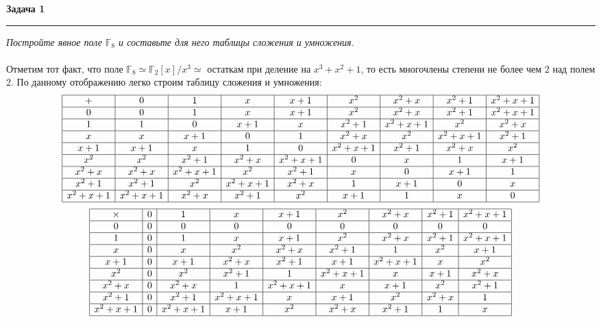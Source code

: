\documentclass[a4paper,11pt]{article}
\newcommand{\F}{\mathbb{F}}
\begin{document}
\textbf{\large Задача 1}
\medskip\hrule\medskip
\textit{Постройте явное поле $ \F_8 $ и составьте для него таблицы сложения и умножения.} \\ \\
Отметим тот факт, что поле $ \F_8 \simeq \F_2[x] / x^3 \simeq $ остаткам при деление на $ x^3 + x^2 + 1 $, то есть многочлены степени не более чем 2 над полем 2. По данному отображению легко строим таблицу сложения и умножения:
\begin{gather*}
	\begin{array}{|c|c|c|c|c|c|c|c|c|}
	\hline
	+			& 0 & 1 & x & x + 1 & x^2 & x^2 + x & x^2 + 1 &  x^2 + x + 1\\
	\hline
	0			& 0 & 1 & x & x + 1 & x^2 & x^2 + x & x^2 + 1 &  x^2 + x + 1\\
	\hline
	1			& 1 & 0 & x + 1 & x & x^2 + 1 & x^2 + x + 1 & x^2 &  x^2 + x\\
	\hline
	x			& x & x + 1 & 0 & 1 & x^2 + x & x^2 & x^2 + x + 1 &  x^2 + 1\\
	\hline
	x + 1		& x + 1 & x & 1 & 0 & x^2 + x + 1 & x^2 + 1 & x^2 + x &  x^2\\
	\hline
	x^2			& x^2 & x^2 + 1 & x^2 + x & x^2 + x + 1 & 0 & x & 1 & x + 1\\
	\hline
	x^2 + x		& x^2 + x & x^2 + x + 1 & x^2 & x^2 + 1 & x & 0 & x + 1 & 1\\
	\hline
	x^2 + 1		& x^2 + 1 & x^2 & x^2 + x + 1 & x^2 + x & 1 & x + 1 & 0 & x\\
	\hline
	x^2 + x + 1	& x^2 + x + 1 & x^2 + x & x^2 + 1 & x^2 & x + 1 & 1 & x & 0\\
	\hline
\end{array}
\end{gather*}
\begin{gather*}
	\begin{array}{|c|c|c|c|c|c|c|c|c|}
	\hline
	\times		& 0 & 1 & x & x + 1 & x^2 & x^2 + x & x^2 + 1 &  x^2 + x + 1\\
	\hline
	0			& 0 & 0 & 0 & 0 & 0 & 0 & 0 &  0\\
	\hline
	1			& 0 & 1 & x & x + 1 & x^2 & x^2 + x & x^2 + 1 &  x^2 + x + 1\\
	\hline
	x			& 0 & x & x^2 & x^2 + x & x^2 + 1 & 1 & x^2 &  x + 1\\
	\hline
	x + 1		& 0 & x + 1 & x^2 + x & x^2 + 1 & x + 1 & x^2 + x + 1 & x &  x^2\\
	\hline
	x^2			& 0 & x^2 & x^2 + 1 & 1 & x^2 + x + 1 & x & x + 1 &  x^2 + x\\
	\hline
	x^2 + x		& 0 & x^2 + x & 1 & x^2+x+1 & x & x + 1 & x^2 &  x^2 + 1\\
	\hline
	x^2 + 1		& 0 & x^2 + 1 & x^2 + x + 1 & x & x + 1 & x^2 & x^2 + x & 1\\
	\hline
	x^2 + x + 1	& 0 & x^2 + x + 1 & x + 1 & x^2 & x^2 + x & x^2 + 1 & 1 & x\\
	\hline
	\end{array}
\end{gather*} \\ \\ \\
\end{document}
